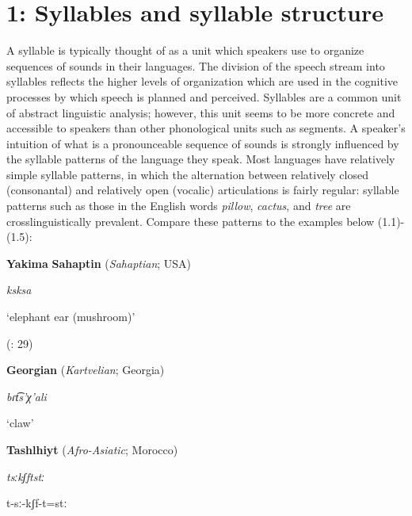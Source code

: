 \chapter{1: Syllables and syllable structure}

  A syllable is typically thought of as a unit which speakers use to organize sequences of sounds in their languages. The division of the speech stream into syllables reflects the higher levels of organization which are used in the cognitive processes by which speech is planned and perceived. Syllables are a common unit of abstract linguistic analysis; however, this unit seems to be more concrete and accessible to speakers than other phonological units such as segments. A speaker’s intuition of what is a pronounceable sequence of sounds is strongly influenced by the syllable patterns of the language they speak. Most languages have relatively simple syllable patterns, in which the alternation between relatively closed (consonantal) and relatively open (vocalic) articulations is fairly regular: syllable patterns such as those in the English words \textit{pillow}, \textit{cactus}, and \textit{tree} are crosslinguistically prevalent. Compare these patterns to the examples below (1.1)-(1.5):



\ea\label{ex:(1.1)}
   \textbf{Yakima} \textbf{Sahaptin} (\textit{Sahaptian}; USA)



\textit{ksksa}



‘elephant ear (mushroom)’



(\citealt{HargusBeavert2006}: 29)
\z



\ea\label{ex:(1.2)}
   \textbf{Georgian} (\textit{Kartvelian}; Georgia)



\textit{bɾt͡s’χ’ali}



‘claw’



\citep[204]{Butskhrikidze2002}


\z

\ea\label{ex:(1.3)}
   \textbf{Tashlhiyt} (\textit{Afro-Asiatic}; Morocco)



\textit{tsːkʃftstː}



t{}-sː{}-kʃf{}-t=stː



